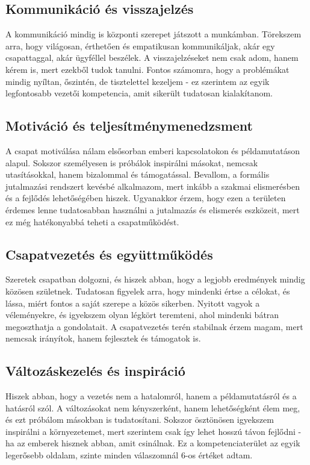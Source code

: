 \subsection{Kommunikáció és visszajelzés}

A kommunikáció mindig is központi szerepet játszott a munkámban.
Törekszem arra, hogy világosan, érthetően és empatikusan kommunikáljak, akár egy csapattaggal, akár ügyféllel beszélek.
A visszajelzéseket nem csak adom, hanem kérem is, mert ezekből tudok tanulni.
Fontos számomra, hogy a problémákat mindig nyíltan, őszintén, 
de tisztelettel kezeljem - ez szerintem az egyik legfontosabb vezetői kompetencia, amit sikerült tudatosan kialakítanom.

\subsection{Motiváció és teljesítménymenedzsment}

A csapat motiválása nálam elsősorban emberi kapcsolatokon és példamutatáson alapul.
Sokszor személyesen is próbálok inspirálni másokat, nemcsak utasításokkal, hanem bizalommal és támogatással.
Bevallom, a formális jutalmazási rendszert kevésbé alkalmazom, mert inkább 
a szakmai elismerésben és a fejlődés lehetőségében hiszek.
Ugyanakkor érzem, hogy ezen a területen érdemes lenne tudatosabban használni 
a jutalmazás és elismerés eszközeit, mert ez még hatékonyabbá teheti a csapatműködést.

\subsection{Csapatvezetés és együttműködés}

Szeretek csapatban dolgozni, és hiszek abban, hogy a legjobb eredmények mindig közösen születnek.
Tudatosan figyelek arra, hogy mindenki értse a célokat, és lássa, miért fontos a saját szerepe a közös sikerben.
Nyitott vagyok a véleményekre, és igyekszem olyan légkört teremteni, ahol mindenki bátran megoszthatja a gondolatait.
A csapatvezetés terén stabilnak érzem magam, mert nemcsak irányítok, hanem fejlesztek és támogatok is.

\subsection{Változáskezelés és inspiráció}

Hiszek abban, hogy a vezetés nem a hatalomról, hanem a példamutatásról és a hatásról szól.
A változásokat nem kényszerként, hanem lehetőségként élem meg, és ezt próbálom másokban is tudatosítani.
Sokszor ösztönösen igyekszem inspirálni a környezetemet, 
mert szerintem csak így lehet hosszú távon fejlődni - ha az emberek hisznek abban, amit csinálnak.
Ez a kompetenciaterület az egyik legerősebb oldalam, szinte minden válaszomnál 6-os értéket adtam.

